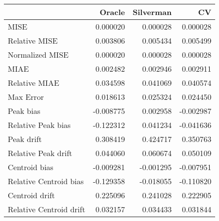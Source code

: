 \begin{tabular}{lrrr}
  \hline
 & Oracle & Silverman & CV \\ 
  \hline
MISE & 0.000020 & 0.000028 & 0.000028 \\ 
  Relative MISE & 0.003806 & 0.005434 & 0.005499 \\ 
  Normalized MISE & 0.000020 & 0.000028 & 0.000028 \\ 
  MIAE & 0.002482 & 0.002946 & 0.002911 \\ 
  Relative MIAE & 0.034598 & 0.041069 & 0.040574 \\ 
  Max Error & 0.018613 & 0.025324 & 0.024450 \\ 
  Peak bias & -0.008775 & 0.002958 & -0.002987 \\ 
  Relative Peak bias & -0.122312 & 0.041234 & -0.041636 \\ 
  Peak drift & 0.308419 & 0.424717 & 0.350763 \\ 
  Relative Peak drift & 0.044060 & 0.060674 & 0.050109 \\ 
  Centroid bias & -0.009281 & -0.001295 & -0.007951 \\ 
  Relative Centroid bias & -0.129358 & -0.018055 & -0.110820 \\ 
  Centroid drift & 0.225096 & 0.241028 & 0.222905 \\ 
  Relative Centroid drift & 0.032157 & 0.034433 & 0.031844 \\ 
   \hline
\end{tabular}
